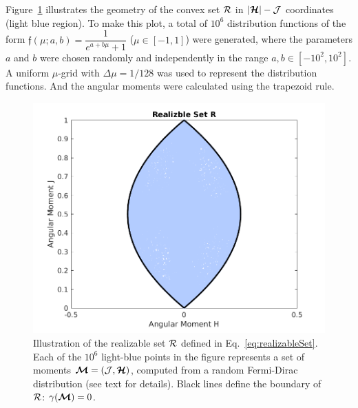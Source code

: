 Figure~\ref{fig:RealizableSetFermionic} illustrates the geometry of the convex set $\mathcal{R}$ in $|\boldsymbol{\mathcal{H}}| - \mathcal{J}$ coordinates (light blue region).
To make this plot, a total of $10^{6}$ distribution functions of the form $\mathfrak{f}(\mu;a,b) = \dfrac{1}{e^{a+b\mu}+1}$ ($\mu\in[-1,1]$) were generated, where the parameters $a$ and $b$ were chosen randomly and independently in the range $a,b\in[-10^{2},10^{2}]$.  
A uniform $\mu$-grid with $\Delta\mu=1/128$ was used to represent the distribution functions. And the angular moments were calculated using the trapezoid rule.  
\begin{figure}[h]
  \centering
  \includegraphics[width=1.0\linewidth]{figures/RealizableSetFermionic}
  \caption{Illustration of the realizable set $\mathcal{R}$ defined in Eq.~\eqref{eq:realizableSet}.  
  Each of the $10^{6}$ light-blue points in the figure represents a set of moments $\boldsymbol{\mathcal{M}}=(\mathcal{J},\boldsymbol{\mathcal{H}})$, computed from a random Fermi-Dirac distribution (see text for details).  
  Black lines define the boundary of $\mathcal{R}$: $\gamma(\boldsymbol{\mathcal{M}}) = 0$.}
  \label{fig:RealizableSetFermionic}
\end{figure}

